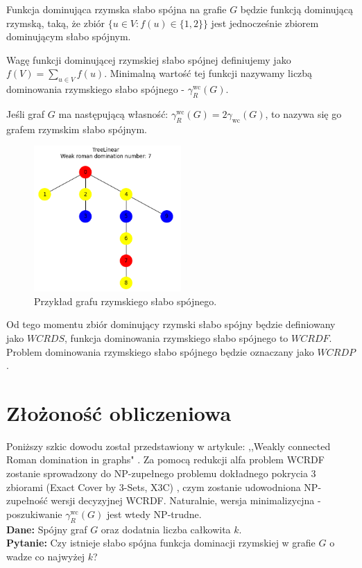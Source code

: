 \begin{definition}
    Funkcja dominująca rzymska słabo spójna na grafie $G$ będzie funkcją dominującą rzymską, taką, że zbiór $\{u \in V: f(u) \in \{1,2\}\}$ jest jednocześnie zbiorem dominującym słabo spójnym.
\end{definition}

\begin{definition}
    Wagę funkcji dominującej rzymskiej słabo spójnej definiujemy jako $f(V) = \sum_{u \in V}{f(u)}$. Minimalną wartość tej funkcji nazywamy liczbą dominowania rzymskiego słabo spójnego - $\gamma_{R}^{\text{wc}}(G)$. 
\end{definition}

\begin{definition}
    Jeśli graf $G$ ma następującą własność: $\gamma_{R}^{\text{wc}}(G) = 2\gamma_{\text{wc}}(G)$, to nazywa się go grafem rzymskim słabo spójnym.
\end{definition}

\begin{figure}[H]
    \centering
    \includegraphics[width=0.5\textwidth]{assets/phase2.png}
    \caption{Przykład grafu rzymskiego słabo spójnego.}
    \label{fig:przykladWCRDF}
\end{figure}

Od tego momentu zbiór dominujący rzymski słabo spójny będzie definiowany jako $WCRDS$, funkcja dominowania rzymskiego słabo spójnego to $WCRDF$. Problem dominowania rzymskiego słabo spójnego będzie oznaczany jako $WCRDP$.

\section{Złożoność obliczeniowa}
Poniższy szkic dowodu został przedstawiony w artykule: ,,Weakly connected Roman domination in graphs"  \cite{theoryWCRDF}. 
Za pomocą redukcji alfa problem WCRDF zostanie sprowadzony do NP-zupełnego problemu dokładnego pokrycia 3 zbiorami (Exact Cover by 3-Sets, X3C) \cite{X3C}, czym zostanie udowodniona NP-zupełność wersji decyzyjnej WCRDF. Naturalnie, wersja minimalizycjna - poszukiwanie $\gamma_{R}^{\text{wc}}(G)$ jest wtedy NP-trudne.\\
\textbf{Dane:} Spójny graf $G$ oraz dodatnia liczba całkowita $k$.\\
\textbf{Pytanie:} Czy istnieje słabo spójna funkcja dominacji rzymskiej w grafie $G$ o wadze co najwyżej $k$?\\

